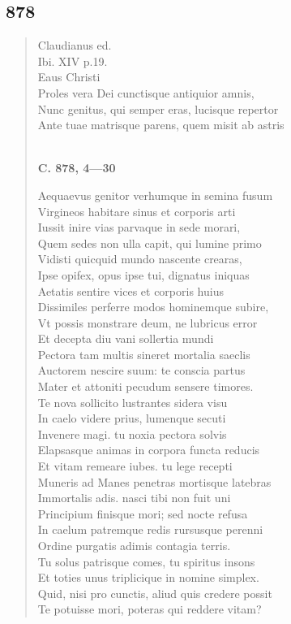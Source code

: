 \documentclass[11pt, a4paper]{report}
\begin{document}
            \subsection*{878}
      \begin{verse}
      Claudianus ed. \\ Ibi. XIV p.19. \\ Eaus Christi \\ Proles vera Dei cunctisque antiquior amnis, \\ Nunc genitus, qui semper eras, lucisque repertor \\ Ante tuae matrisque parens, quem misit ab astris \\ 
        ﻿\pagebreak 
     \marginpar{[328]} \begin{center} \textbf{C. 878, 4—30} \end{center}Aequaevus genitor verhumque in semina fusum \\ Virgineos habitare sinus et corporis arti \\ Iussit inire vias parvaque in sede morari, \\ Quem sedes non ulla capit, qui lumine primo \\ Vidisti quicquid mundo nascente crearas, \\ Ipse opifex, opus ipse tui, dignatus iniquas \\ Aetatis sentire vices et corporis huius \\ Dissimiles perferre modos hominemque subire, \\ Vt possis monstrare deum, ne lubricus error \\ Et decepta diu vani sollertia mundi \\ Pectora tam multis sineret mortalia saeclis \\ Auctorem nescire suum: te conscia partus \\ Mater et attoniti pecudum sensere timores. \\ Te nova sollicito lustrantes sidera visu \\ In caelo videre prius, lumenque secuti \\ Invenere magi. tu noxia pectora solvis \\ Elapsasque animas in corpora functa reducis \\ Et vitam remeare iubes. tu lege recepti \\ Muneris ad Manes penetras mortisque latebras \\ Immortalis adis. nasci tibi non fuit uni \\ Principium finisque mori; sed nocte refusa \\ In caelum patremque redis rursusque perenni \\ Ordine purgatis adimis contagia terris. \\ Tu solus patrisque comes, tu spiritus insons \\ Et toties unus triplicique in nomine simplex. \\ Quid, nisi pro cunctis, aliud quis credere possit \\ Te potuisse mori, poteras qui reddere vitam? \\ 

\end{verse}
\end{document}
